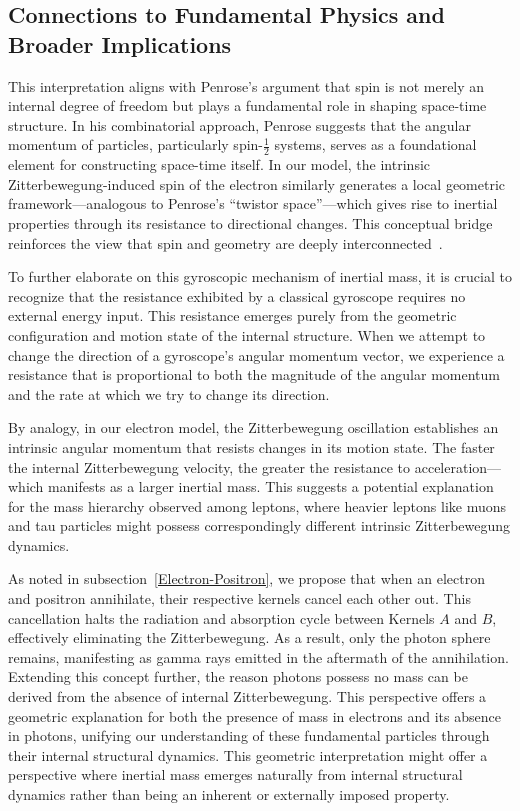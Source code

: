 \documentclass[%
 reprint,
 amsmath,amssymb,
 aps,
]{revtex4-1}
\numberwithin{equation}{section}%
\begin{document}
\subsection{Connections to Fundamental Physics and Broader Implications}

This interpretation aligns with Penrose's argument that spin is not merely an internal degree of freedom but plays a fundamental role in shaping space-time structure. In his combinatorial approach, Penrose suggests that the angular momentum of particles, particularly spin-$\frac{1}{2}$ systems, serves as a foundational element for constructing space-time itself. In our model, the intrinsic Zitterbewegung-induced spin of the electron similarly generates a local geometric framework—analogous to Penrose’s ``twistor space''—which gives rise to inertial properties through its resistance to directional changes. This conceptual bridge reinforces the view that spin and geometry are deeply interconnected~\cite{penrose1971}.

To further elaborate on this gyroscopic mechanism of inertial mass, it is crucial to recognize that the resistance exhibited by a classical gyroscope requires no external energy input. This resistance emerges purely from the geometric configuration and motion state of the internal structure. When we attempt to change the direction of a gyroscope's angular momentum vector, we experience a resistance that is proportional to both the magnitude of the angular momentum and the rate at which we try to change its direction.

By analogy, in our electron model, the Zitterbewegung oscillation establishes an intrinsic angular momentum that resists changes in its motion state. The faster the internal Zitterbewegung velocity, the greater the resistance to acceleration—which manifests as a larger inertial mass. This suggests a potential explanation for the mass hierarchy observed among leptons, where heavier leptons like muons and tau particles might possess correspondingly different intrinsic Zitterbewegung dynamics.

As noted in subsection~\ref{Electron-Positron}, we propose that when an electron and positron annihilate, their respective kernels cancel each other out. This cancellation halts the radiation and absorption cycle between Kernels $A$ and $B$, effectively eliminating the Zitterbewegung. As a result, only the photon sphere remains, manifesting as gamma rays emitted in the aftermath of the annihilation. Extending this concept further, the reason photons possess no mass can be derived from the absence of internal Zitterbewegung. This perspective offers a geometric explanation for both the presence of mass in electrons and its absence in photons, unifying our understanding of these fundamental particles through their internal structural dynamics. This geometric interpretation might offer a perspective where inertial mass emerges naturally from internal structural dynamics rather than being an inherent or externally imposed property. 
\end{document}
